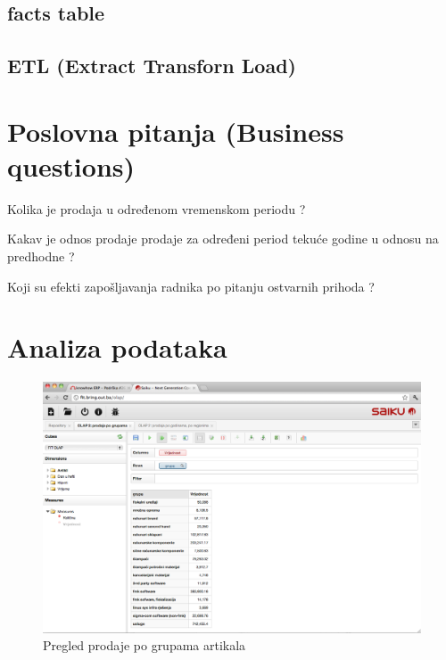 \documentclass[times, utf8, seminar]{fit}
\begin{document}
\subsection{facts table}



\subsection{ETL (Extract Transforn Load)}



\section{Poslovna pitanja (Business questions)}

Kolika je prodaja u određenom vremenskom periodu ?

Kakav je odnos prodaje prodaje za određeni period tekuće godine u odnosu na predhodne ?

Koji su efekti zapošljavanja radnika po pitanju ostvarnih prihoda ?


\section{Analiza podataka}



\begin{figure}[H]
\centering
\includegraphics[width=15cm]{img/saiku_rpt_grupe}
\caption{Pregled prodaje po grupama artikala}
\end{figure}
\end{document}
